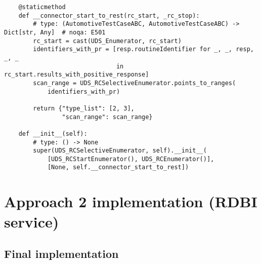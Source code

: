 \begin{verbatim}
    @staticmethod
    def __connector_start_to_rest(rc_start, _rc_stop):
        # type: (AutomotiveTestCaseABC, AutomotiveTestCaseABC) -> Dict[str, Any]  # noqa: E501
        rc_start = cast(UDS_Enumerator, rc_start)
        identifiers_with_pr = [resp.routineIdentifier for _, _, resp, _, _
                               in rc_start.results_with_positive_response]
        scan_range = UDS_RCSelectiveEnumerator.points_to_ranges(
            identifiers_with_pr)

        return {"type_list": [2, 3],
                "scan_range": scan_range}

    def __init__(self):
        # type: () -> None
        super(UDS_RCSelectiveEnumerator, self).__init__(
            [UDS_RCStartEnumerator(), UDS_RCEnumerator()],
            [None, self.__connector_start_to_rest])

\end{verbatim}

\section{Approach 2 implementation (RDBI service)}

\subsection{Final implementation}
\label{app:rdbi-implementation}

